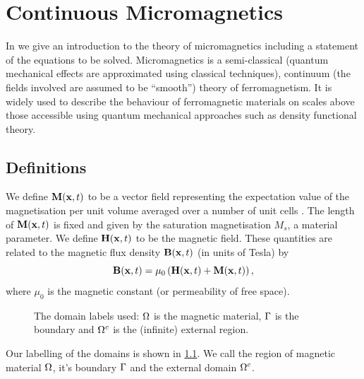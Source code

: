 \chapter{Continuous Micromagnetics}
\label{sec:cont-micromag}

In  we give an introduction to the theory of micromagnetics including a statement of the equations to be solved.
Micromagnetics is a semi-classical (\ie quantum mechanical effects are approximated using classical techniques), continuum (\ie the fields involved are assumed to be ``smooth'') theory of ferromagnetism.
It is widely used to describe the behaviour of ferromagnetic materials on scales above those accessible using quantum mechanical approaches such as density functional theory.


\section{Definitions}
We define $\boldsymbol{\mathrm{M}}(\boldsymbol{\mathrm{x}},t)$ to be a vector field representing the expectation value of the magnetisation per unit volume averaged over a number of unit cells \cite{Aharoni1996}.
The length of $\boldsymbol{\mathrm{M}}(\boldsymbol{\mathrm{x}},t)$ is fixed and given by the saturation magnetisation $M_s$, a material parameter.
We define $\boldsymbol{\mathrm{H}}(\boldsymbol{\mathrm{x}},t)$ to be the magnetic field.
These quantities are related to the magnetic flux density $\boldsymbol{\mathrm{B}}(\boldsymbol{\mathrm{x}},t)$ (in units of Tesla) by
\begin{equation}
  \label{eq:37}
  \boldsymbol{\mathrm{B}}(\boldsymbol{\mathrm{x}},t) = \mu_0 \left( \boldsymbol{\mathrm{H}}(\boldsymbol{\mathrm{x}},t) + \boldsymbol{\mathrm{M}}(\boldsymbol{\mathrm{x}},t) \right),
\end{equation}
where $\mu_0$ is the magnetic constant (or permeability of free space).

\begin{figure}
  \center
  \caption{The domain labels used: $\Omega$ is the magnetic material, ${\Gamma}$ is the boundary and ${\Omega^c}$ is the (infinite) external region.} \label{fig:domain_labels}
\end{figure}

Our labelling of the domains is shown in \cref{fig:domain_labels}.
We call the region of magnetic material $\Omega$, it's boundary ${\Gamma}$ and the external domain ${\Omega^c}$.


